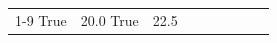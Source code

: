 \begin{table}[H]
\begin{tabular}{lllrlllll}
\cline{1-9}
True & 20.0%
\cline{1-9}
True & 22.5%

\end{tabular}
\end{table}
